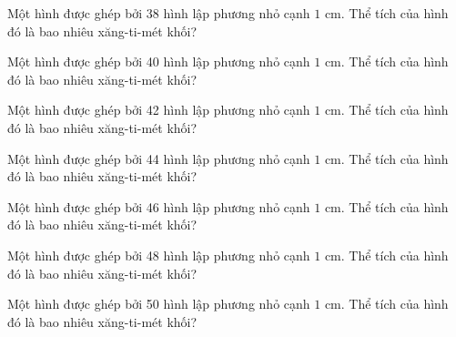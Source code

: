 \begin{ex}
  Một hình được ghép bởi 38 hình lập phương nhỏ cạnh $1\text{ cm}$. Thể tích của hình đó là bao nhiêu xăng-ti-mét khối?
\end{ex}

\begin{ex}
  Một hình được ghép bởi 40 hình lập phương nhỏ cạnh $1\text{ cm}$. Thể tích của hình đó là bao nhiêu xăng-ti-mét khối?
\end{ex}

\begin{ex}
  Một hình được ghép bởi 42 hình lập phương nhỏ cạnh $1\text{ cm}$. Thể tích của hình đó là bao nhiêu xăng-ti-mét khối?
\end{ex}

\begin{ex}
  Một hình được ghép bởi 44 hình lập phương nhỏ cạnh $1\text{ cm}$. Thể tích của hình đó là bao nhiêu xăng-ti-mét khối?
\end{ex}

\begin{ex}
  Một hình được ghép bởi 46 hình lập phương nhỏ cạnh $1\text{ cm}$. Thể tích của hình đó là bao nhiêu xăng-ti-mét khối?
\end{ex}

\begin{ex}
  Một hình được ghép bởi 48 hình lập phương nhỏ cạnh $1\text{ cm}$. Thể tích của hình đó là bao nhiêu xăng-ti-mét khối?
\end{ex}

\begin{ex}
  Một hình được ghép bởi 50 hình lập phương nhỏ cạnh $1\text{ cm}$. Thể tích của hình đó là bao nhiêu xăng-ti-mét khối?
\end{ex}

